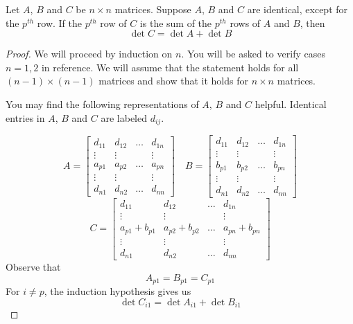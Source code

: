 \documentclass{ximera}
\begin{document}
\begin{lemma}\label{lemma:arowsumofbc}
Let $A$, $B$ and $C$ be $n\times n$ matrices. Suppose $A$, $B$ and $C$ are identical, except for the $p^{th}$ row.  If the $p^{th}$ row of $C$ is the sum of the $p^{th}$ rows of $A$ and $B$, then
$$\det{C}=\det{A}+\det{B}$$
\end{lemma}
\begin{proof}
We will proceed by induction on $n$.  You will be asked to verify cases $n=1, 2$ in {\color{red}reference}.  We will assume that the statement holds for all $(n-1)\times (n-1)$ matrices and show that it holds for $n\times n$ matrices.

You may find the following representations of $A$, $B$ and $C$ helpful.  Identical entries in $A$, $B$ and $C$ are labeled $d_{ij}$.

$$A=\begin{bmatrix} d_{11} & d_{12} & \dots  & d_{1n}  \\
   \vdots & \vdots &  & \vdots \\
   a_{p1} & a_{p2} &\dots  & a_{pn}  \\
   \vdots & \vdots &  & \vdots  \\
   d_{n1} & d_{n2} & \dots  & d_{nn}\end{bmatrix}\quad
   B=\begin{bmatrix} d_{11} & d_{12} & \dots  & d_{1n}  \\
   \vdots & \vdots &  & \vdots \\
   b_{p1} & b_{p2} &\dots  & b_{pn}  \\
   \vdots & \vdots &  & \vdots  \\
   d_{n1} & d_{n2} & \dots  & d_{nn}\end{bmatrix}$$
   $$C=\begin{bmatrix} d_{11} & d_{12} & \dots  & d_{1n}  \\
   \vdots & \vdots &  & \vdots \\
   a_{p1}+b_{p1} & a_{p2}+b_{p2} &\dots  & a_{pn}+b_{pn}  \\
   \vdots & \vdots &  & \vdots  \\
   d_{n1} & d_{n2} & \dots  & d_{nn}\end{bmatrix}$$
Observe that $$A_{p1}=B_{p1}=C_{p1}$$  For $i\neq p$, the induction hypothesis gives us
$$\det{C_{i1}}=\det{A_{i1}}+\det{B_{i1}}$$
   

\end{proof}
\end{document}
